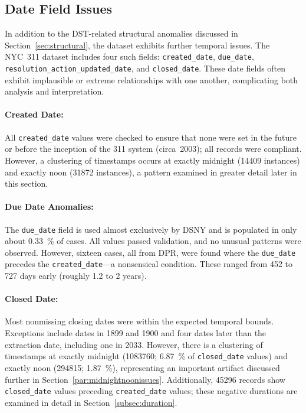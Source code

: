 \documentclass[linenumber]{jdsart}
\begin{document}

\subsection{Date Field Issues}
\label{subsec:datefieldissues}
In addition to the DST-related structural anomalies discussed in
Section~\ref{sec:structural}, the dataset exhibits further temporal 
issues. The NYC~311 dataset includes four such fields:
\texttt{created\_date}, \texttt{due\_date}, \texttt{resolution\_action\_updated\_date}, and
\texttt{closed\_date}. These date fields often exhibit implausible or extreme
relationships with one another, complicating both analysis
and interpretation.


\paragraph{Created Date:}
\label{sec:createddate}
All \texttt{created\_date} values were checked to ensure that none were set in
the future or before the inception of the 311 system (circa~2003); all records
were compliant. However, a clustering of timestamps occurs at exactly
midnight (\num{14409} instances) and exactly noon
(\num{31872} instances), a pattern examined in greater
detail later in this section.


\paragraph{Due Date Anomalies:}
\label{par:duedate}
The \texttt{due\_date} field is used almost exclusively by \textsc{DSNY} 
and is populated in only about
\SI[round-precision = 2]{0.33}{\percent} of cases. All values passed validation, and no unusual patterns were observed.
However, sixteen cases, all from DPR, were found where the \texttt{due\_date} precedes the
\texttt{created\_date}—a nonsensical condition. These ranged from \num{452} to
\num{727} days early (roughly 1.2 to 2 years). 

\paragraph{Closed Date:}
\label{par:closeddate}
Most nonmissing closing dates were within the expected temporal bounds.
Exceptions include dates in 1899 and 1900 and four dates later than
the extraction date, including one in 2033.
However, there is a clustering of timestamps at exactly midnight
(\num{1083760};
\SI[round-mode=places, round-precision=2]{6.87}{\percent}
of \texttt{closed\_date} values) and exactly noon
(\num{294815};
\SI[round-mode=places, round-precision=2]{1.87}{\percent}),
representing an important artifact discussed further in
Section~\ref{par:midnightnoonissues}.
Additionally, \num{45296} records show
\texttt{closed\_date} values preceding
\texttt{created\_date} values;
these negative durations are examined in detail in
Section~\ref{subsec:duration}.
\end{document}

